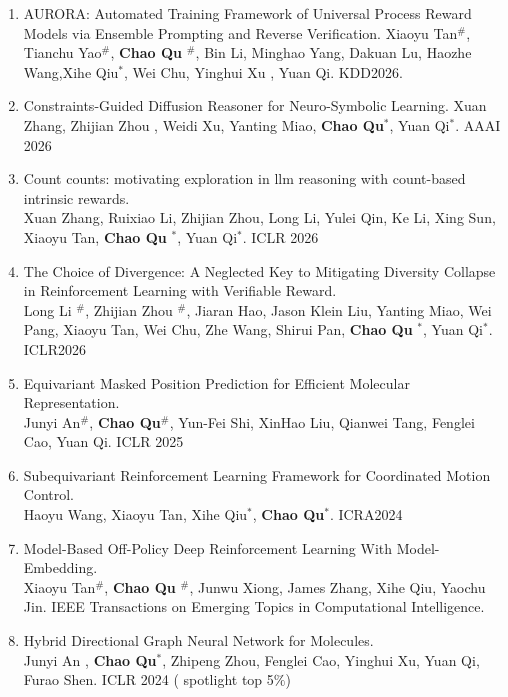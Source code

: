 \documentclass{resume}
\begin{document}
\begin{enumerate}

       \item AURORA: Automated Training Framework of Universal Process Reward
Models via Ensemble Prompting and Reverse Verification. Xiaoyu Tan$^\#$, Tianchu Yao$^\#$, \textbf{Chao Qu} $^\#$, Bin Li, Minghao Yang, Dakuan Lu, Haozhe Wang,Xihe Qiu$^*$, Wei Chu, Yinghui Xu , Yuan Qi.  KDD2026.

    \item Constraints-Guided Diffusion Reasoner for Neuro-Symbolic Learning.
    Xuan Zhang, Zhijian Zhou , Weidi Xu, Yanting Miao, \textbf{Chao Qu}$^*$, Yuan Qi$^*$.   AAAI 2026


    \item Count counts: motivating exploration in llm reasoning with count-based intrinsic rewards. \\ Xuan Zhang, Ruixiao Li, Zhijian Zhou, Long Li, Yulei Qin, Ke Li, Xing Sun, Xiaoyu Tan, \textbf{Chao Qu} $^*$, Yuan Qi$^*$. ICLR 2026
    \item The Choice of Divergence: A Neglected Key to Mitigating Diversity Collapse in Reinforcement Learning with Verifiable Reward. \\ Long Li $^\#$, Zhijian Zhou $^\#$, Jiaran Hao, Jason Klein Liu, Yanting Miao, Wei Pang, Xiaoyu Tan, Wei Chu, Zhe Wang, Shirui Pan, \textbf{Chao Qu} $^*$, Yuan Qi$^*$. ICLR2026

    \item Equivariant Masked Position Prediction for Efficient Molecular Representation. \\ Junyi An$^\#$, \textbf{Chao Qu}$^\#$, Yun-Fei Shi, XinHao Liu, Qianwei Tang, Fenglei Cao, Yuan Qi. ICLR 2025
    \item Subequivariant Reinforcement Learning Framework for Coordinated Motion Control. \\ Haoyu Wang, Xiaoyu Tan, Xihe Qiu$^*$, \textbf{Chao Qu}$^*$. ICRA2024
    \item Model-Based Off-Policy Deep Reinforcement Learning With Model-Embedding. \\ Xiaoyu Tan$^\#$, \textbf{Chao Qu} $^\#$, Junwu Xiong, James Zhang, Xihe Qiu, Yaochu Jin. IEEE Transactions on Emerging Topics in Computational Intelligence.
    \item Hybrid Directional Graph Neural Network for Molecules.\\  Junyi An , \textbf{Chao Qu}$^*$, Zhipeng Zhou, Fenglei Cao, Yinghui Xu, Yuan Qi, Furao Shen. ICLR 2024  {\color{red}( spotlight top 5$\%$)}


\end{enumerate}
\end{document}
